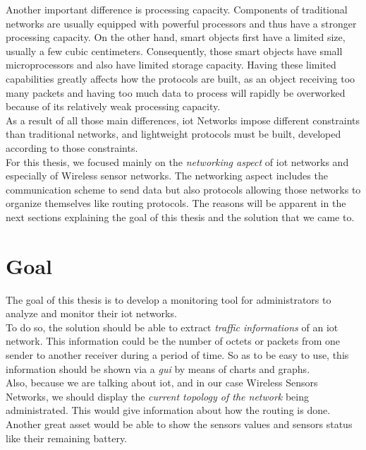 Another important difference is processing capacity. Components of traditional networks are usually equipped with powerful processors and thus have a stronger processing capacity. On the other hand, smart objects first have a limited size, usually a few cubic centimeters. Consequently, those smart objects have small microprocessors and also have limited storage capacity. Having these limited capabilities greatly affects how the protocols are built, as an object receiving too many packets and having too much data to process will rapidly be overworked because of its relatively weak processing capacity. \\

As a result of all those main differences, \acrshort{iot} Networks impose different constraints than traditional networks, and lightweight protocols must be built, developed according to those constraints.\\

For this thesis, we focused mainly on the \textit{networking aspect} of \acrlong{iot} networks and especially of Wireless sensor networks. The networking aspect includes the communication scheme to send data but also protocols allowing those networks to organize themselves like routing protocols. The reasons will be apparent in the next sections explaining the goal of this thesis and the solution that we came to.

\section*{Goal}

The goal of this thesis is to develop a monitoring tool for administrators to analyze and monitor their \acrshort{iot} networks.\\

To do so, the solution should be able to extract \textit{traffic informations} of an \acrshort{iot} network. This information could be the number of octets or packets from one sender to another receiver during a period of time. So as to be easy to use, this information should be shown via a \textit{\acrfull{gui}} by means of charts and graphs. \\

Also, because we are talking about \acrlong{iot}, and in our case Wireless Sensors Networks, we should display the \textit{current topology of the network} being administrated. This would give information about how the routing is done. Another great asset would be able to show the sensors values and sensors status like their remaining battery.\\

